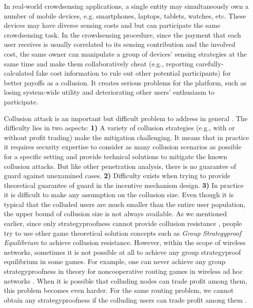 \documentclass[conference]{IEEEtran}
\theoremstyle{definition}
\begin{document}

In real-world crowdsensing applications, a single entity may simultaneously own a number of mobile devices, e.g. smartphones, laptops, tablets, watches, etc. These devices may have diverse sensing costs and but can participate the same crowdsensing task. In the crowdsensing procedure, since the payment that each user receives is usually correlated to its sensing contribution and the involved cost, the same owner can manipulate a group of devices' sensing strategies at the same time and make them collaboratively cheat (e.g., reporting carefully-calculated fake cost information to rule out other potential participants) for better payoffs as a collusion. It creates serious problems for the platform, such as losing system-wide utility and deteriorating other users' enthusiasm to participate.

Collusion attack is an important but difficult problem to address in general \cite{zhong2007designing, wang2006low, jurca2007collusion}. 
The difficulty lies in two aspects: \textbf{1)} A variety of collusion strategies (e.g., with or without profit trading) make the mitigation challenging. It means that in practice it requires security expertise to consider as many collusion scenarios as possible for a specific setting and provide technical solutions to mitigate the known collusion attacks. But like other penetration analysis, there is no guarantee of guard against unexamined cases. \textbf{2)} Difficulty exists when trying to provide theoretical guarantee of guard in the incentive mechanism design. {\color{blue}\textbf{3)} In practice it is difficult to make any assumption on the collusion size. Even though it is typical that the colluded users are much smaller than the entire user population, the upper bound of collusion size is not always available. } 
As we mentioned earlier, since only strategyproofness cannot provide collusion resistance \cite{zhong2007designing}, people try to use other game theoretical solution concepts such as \emph{Group Strategyproof Equilibrium} \cite{jain1999group} to achieve collusion resistance. %
However, within the scope of wireless networks, sometimes it is not possible at all to achieve any group strategyproof equilibrium in some games. For example, one can never achieve any group strategyproofness in theory for noncooperative routing games in wireless ad hoc networks \cite{zhong2007designing}. When it is possible that colluding nodes can trade profit among them, this problem becomes even harder. For the same routing problem, we cannot obtain any strategyproofness if the colluding users can trade profit among them \cite{wang2006low}.
\end{document}
